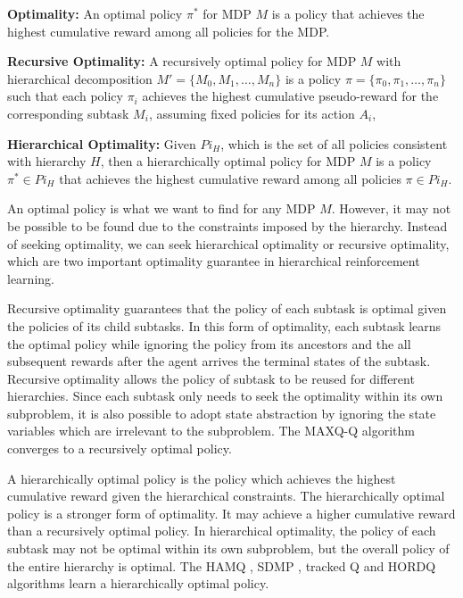 \begin{definition}
    \textbf{Optimality:} An optimal policy $\pi^*$ for MDP $M$ is a policy that achieves the highest cumulative reward
    among all policies for the MDP.
\end{definition}
\begin{definition}
    \textbf{Recursive Optimality:} A recursively optimal policy for MDP $M$ with hierarchical 
    decomposition $M' = \{M_0, M_1, \dots, M_n\}$ is a policy $\pi = \{\pi_0, \pi_1, \dots, \pi_n\}$ such
    that each policy $\pi_i$ achieves the highest cumulative pseudo-reward for the corresponding subtask $M_i$,
    assuming fixed policies for its action $A_i$, 
\end{definition}
\begin{definition}
    \textbf{Hierarchical Optimality:} Given $Pi_H$, which is the set of all policies consistent with hierarchy $H$, 
    then a hierarchically optimal policy for MDP $M$ is a policy $\pi^* \in Pi_H$ that achieves the highest cumulative reward
    among all policies $\pi \in Pi_H$.
\end{definition}

An optimal policy is what we want to find for any MDP $M$. However, it may not be possible to 
be found due to the constraints imposed by the hierarchy. Instead of seeking optimality, 
we can seek hierarchical optimality or recursive optimality, which are two important 
optimality guarantee in hierarchical reinforcement learning.

Recursive optimality guarantees that the policy of each subtask is optimal given the policies of its child subtasks.
In this form of optimality, each subtask learns the optimal policy while ignoring the policy from its ancestors
and the all subsequent rewards after the agent arrives the terminal states of the subtask.
Recursive optimality allows the policy of subtask to be reused for different hierarchies. Since
each subtask only needs to seek the optimality within its own subproblem, it is also possible
to adopt state abstraction by ignoring the state variables which are irrelevant
to the subproblem. The MAXQ-Q \cite{MaxQJ} algorithm converges to a recursively optimal policy. 

A hierarchically optimal policy is the policy which achieves the highest cumulative reward given the
hierarchical constraints. The hierarchically optimal policy is a stronger form of optimality. It
may achieve a higher cumulative reward than a recursively optimal policy. In hierarchical optimality, 
the policy of each subtask may not be optimal within its own subproblem, but the overall policy 
of the entire hierarchy is optimal. The HAMQ \cite{HAMQ}, SDMP \cite{SMDP}, tracked Q and HORDQ \cite{HORDQ} algorithms learn
a hierarchically optimal policy.

